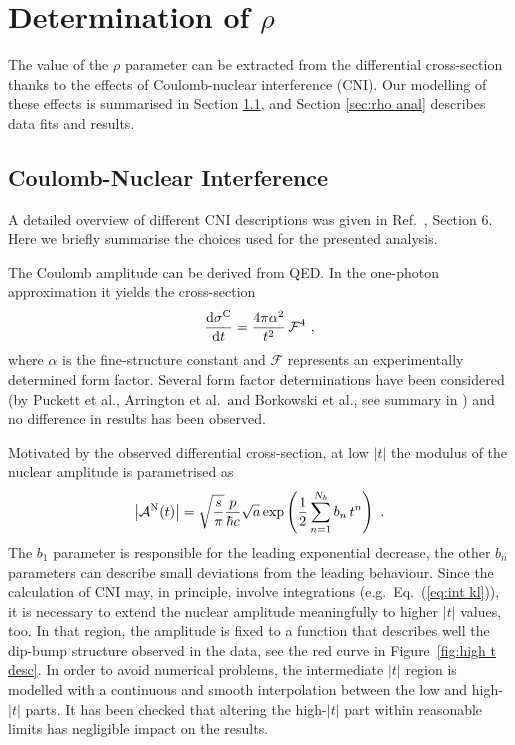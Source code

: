 \section{Determination of $\rho$}
\label{sec:rho}

The value of the $\rho$ parameter can be extracted from the differential cross-section thanks to the effects of Coulomb-nuclear interference (CNI). Our modelling of these effects is summarised in Section \ref{sec:rho cni}, and Section \ref{sec:rho anal} describes data fits and results.

\subsection{Coulomb-Nuclear Interference}
\label{sec:rho cni}

A detailed overview of different CNI descriptions was given in Ref.~\cite{totem-8tev-1km}, Section 6. Here we briefly summarise the choices used for the presented analysis.

The Coulomb amplitude can be derived from QED. In the one-photon approximation it yields the cross-section
\begin{equation}
\label{eq:coul cs}
	{{\rm d}\sigma^{\rm C}\over {\rm d}t} = {4\pi\alpha^2\over t^2}\,{\mathcal{F}}^4\ ,
\end{equation}
where $\alpha$ is the fine-structure constant and $\mathcal{F}$ represents an experimentally determined form factor. Several form factor determinations have been considered (by Puckett et al., Arrington et al.~and Borkowski et al., see summary in \cite{elegent}) and no difference in results has been observed.

Motivated by the observed differential cross-section, at low $|t|$ the modulus of the nuclear amplitude is parametrised as
\begin{equation}
\label{eq:nuc mod}
\left | {\cal A}^{\rm N}(t) \right | = \sqrt{s\over\pi} {p\over \hbar c} \sqrt{a} \exp\left( {1\over 2} \sum\limits_{n = 1}^{N_b} b_n\, t^n \right)\ .
\end{equation}
The $b_1$ parameter is responsible for the leading exponential decrease, the other $b_n$ parameters can describe small deviations from the leading behaviour. Since the calculation of CNI may, in principle, involve integrations (e.g.~Eq.~(\ref{eq:int kl})), it is necessary to extend the nuclear amplitude meaningfully to higher $|t|$ values, too. In that region, the amplitude is fixed to a function that describes well the dip-bump structure observed in the data, see the red curve in Figure~\ref{fig:high t desc}. In order to avoid numerical problems, the intermediate $|t|$ region is modelled with a continuous and smooth interpolation between the low and high-$|t|$ parts. It has been checked that altering the high-$|t|$ part within reasonable limits has negligible impact on the results.

